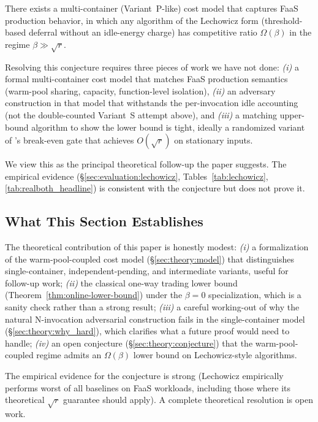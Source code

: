 \begin{conjecture}
\label{conj:lech-lb}
There exists a multi-container (Variant~P-like) cost model that
captures FaaS production behavior, in which any algorithm of the
Lechowicz form (threshold-based deferral without an idle-energy
charge) has competitive ratio $\Omega(\beta)$ in the regime
$\beta \gg \sqrt{r}$.
\end{conjecture}

Resolving this conjecture requires three pieces of work we have not
done:
\emph{(i)} a formal multi-container cost model that matches FaaS
production semantics (warm-pool sharing, capacity, function-level
isolation),
\emph{(ii)} an adversary construction in that model that withstands
the per-invocation idle accounting (not the double-counted Variant~S
attempt above), and
\emph{(iii)} a matching upper-bound algorithm to show the lower bound
is tight, ideally a randomized variant of \GreenFaaS{}'s break-even
gate that achieves $O(\sqrt{r})$ on stationary inputs.

We view this as the principal theoretical follow-up the paper
suggests. The empirical evidence
(\S\ref{sec:evaluation:lechowicz},
Tables~\ref{tab:lechowicz}, \ref{tab:realboth_headline}) is
consistent with the conjecture but does not prove it.

\subsection{What This Section Establishes}
\label{sec:theory:summary}

The theoretical contribution of this paper is honestly modest:
\emph{(i)} a formalization of the warm-pool-coupled cost model
(\S\ref{sec:theory:model}) that distinguishes single-container,
independent-pending, and intermediate variants, useful for
follow-up work;
\emph{(ii)} the classical one-way trading lower bound
(Theorem~\ref{thm:online-lower-bound}) under the $\beta=0$
specialization, which is a sanity check rather than a strong result;
\emph{(iii)} a careful working-out of why the natural N-invocation
adversarial construction fails in the single-container model
(\S\ref{sec:theory:why_hard}), which clarifies what a future proof
would need to handle;
\emph{(iv)} an open conjecture (\S\ref{sec:theory:conjecture}) that
the warm-pool-coupled regime admits an $\Omega(\beta)$ lower bound on
Lechowicz-style algorithms.

The empirical evidence for the conjecture is strong (Lechowicz
empirically performs worst of all baselines on FaaS workloads,
including those where its theoretical $\sqrt{r}$ guarantee should
apply). A complete theoretical resolution is open work.
